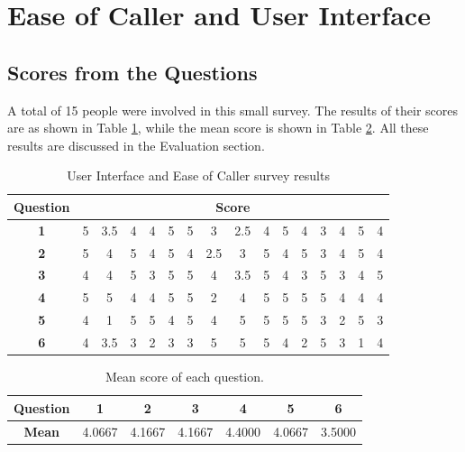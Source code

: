 \documentclass[main.tex]{subfiles}
\begin{document}
\section{Ease of Caller and User Interface}
\subsection{Scores from the Questions}
A total of 15 people were involved in this small survey. The results of their scores are as shown in Table \ref{tbl:survey}, while the mean score is shown in Table \ref{tbl:mean}. All these results are discussed in the Evaluation section. 

\begin{table}[htb]
\centering
\begin{tabular}{|c|ccccccccccccccc|}
	\hline
\textbf{Question} & \multicolumn{15}{|c|}{\textbf{Score}} \\\hline
\textbf{1} & 5 & 3.5 & 4 & 4 & 5 & 5 & 3 & 2.5 & 4 & 5 & 4 & 3 & 4 & 5 & 4 \\
\textbf{2} & 5 & 4 & 5 & 4 & 5 & 4 & 2.5 & 3 & 5 & 4 & 5 & 3 & 4 & 5 & 4 \\
\textbf{3} & 4 & 4 & 5 & 3 & 5 & 5 & 4 & 3.5 & 5 & 4 & 3 & 5 & 3 & 4 & 5 \\
\textbf{4} & 5 & 5 & 4 & 4 & 5 & 5 & 2 & 4 & 5 & 5 & 5 & 5 & 4 & 4 & 4 \\
\textbf{5} & 4 & 1 & 5 & 5 & 4 & 5 & 4 & 5 & 5 & 5 & 5 & 3 & 2 & 5 & 3 \\
\textbf{6} & 4 & 3.5 & 3 & 2 & 3 & 3 & 5 & 5 & 5 & 4 & 2 & 5 & 3 & 1 & 4\\\hline
\end{tabular}
\caption{User Interface and Ease of Caller survey results}
\label{tbl:survey}
\end{table}

\begin{table}[htb]
\centering
\begin{tabular}{|c|cccccc|}
	\hline
\textbf{Question} & 1 & 2 & 3 & 4 & 5 & 6\\\hline
\textbf{Mean} & 4.0667   & 4.1667   & 4.1667    &4.4000   & 4.0667   & 3.5000\\\hline
\end{tabular}
\caption{Mean score of each question.}
\label{tbl:mean}
\end{table}
\end{document}
